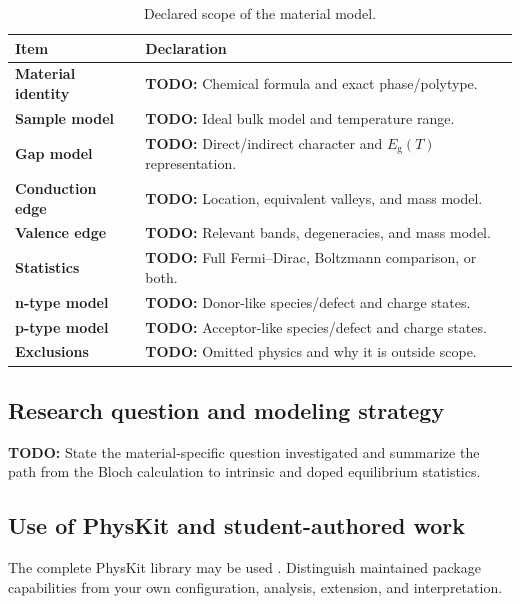 \documentclass[11pt,a4paper]{article}
\newcommand{\Eg}{E_{\mathrm g}}
\newcommand{\todo}[1]{\textcolor{BrickRed}{\textbf{TODO:} #1}}
\begin{document}
\begin{table}[htbp]
  \centering
  \caption{Declared scope of the material model.}
  \label{tab:declaration}
  \begin{tabularx}{\textwidth}{@{}>{\bfseries}p{}X@{}}
    \toprule
    Item & Declaration \\
    \midrule
    Material identity & \todo{Chemical formula and exact phase/polytype.} \\
    Sample model & \todo{Ideal bulk model and temperature range.} \\
    Gap model & \todo{Direct/indirect character and $\Eg(T)$ representation.} \\
    Conduction edge & \todo{Location, equivalent valleys, and mass model.} \\
    Valence edge & \todo{Relevant bands, degeneracies, and mass model.} \\
    Statistics & \todo{Full Fermi--Dirac, Boltzmann comparison, or both.} \\
    n-type model & \todo{Donor-like species/defect and charge states.} \\
    p-type model & \todo{Acceptor-like species/defect and charge states.} \\
    Exclusions & \todo{Omitted physics and why it is outside scope.} \\
    \bottomrule
  \end{tabularx}
\end{table}

\subsection{Research question and modeling strategy}

\todo{State the material-specific question investigated and summarize the path
from the Bloch calculation to intrinsic and doped equilibrium statistics.}

\subsection{Use of PhysKit and student-authored work}

The complete PhysKit library may be used \cite{physkit}. Distinguish maintained
package capabilities from your own configuration, analysis, extension, and
interpretation.
\end{document}

